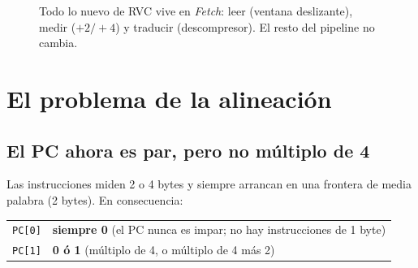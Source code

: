 \documentclass[11pt]{article}
\newcommand{\code}[1]{\texttt{#1}}
\begin{document}
\begin{figure}[H]
\centering
{}
\caption{Todo lo nuevo de RVC vive en \emph{Fetch}: leer (ventana deslizante),
medir ($+2/+4$) y traducir (descompresor). El resto del pipeline no cambia.}
\label{fig:fetch}
\end{figure}

\section{El problema de la alineación}

\subsection{El PC ahora es par, pero no múltiplo de 4}

Las instrucciones miden 2 o 4 bytes y siempre arrancan en una frontera de media
palabra (2 bytes). En consecuencia:

\begin{center}
\begin{tabular}{@{}ll@{}}
\toprule
\code{PC[0]} & \textbf{siempre 0} (el PC nunca es impar; no hay instrucciones de 1 byte) \\
\code{PC[1]} & \textbf{0 ó 1} (múltiplo de 4, o múltiplo de 4 más 2) \\
\bottomrule
\end{tabular}
\end{center}
\end{document}

